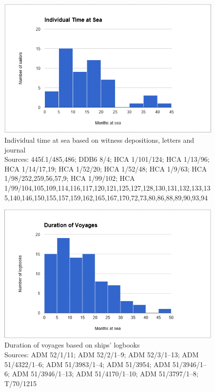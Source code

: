 \begin{figure}
  

\includegraphics[width=\textwidth]{figures/delgado-img9.png}
 

\caption{\label{fig:key:4.2} Individual time at sea based on witness depositions, letters and journal\\
{\tiny Sources: 445f.1/485,486; DDB6 8/4; HCA 1/101/124; HCA 1/13/96; HCA 1/14/17,19; HCA 1/52/20; HCA 1/52/48; HCA 1/9/63; HCA 1/98/252,259,56,57,9; HCA 1/99/102; HCA 1/99/104,105,109,114,116,117,120,121,125,127,128,130,131,132,133,135,140,146,150,155,157,159,162,165,167,170,72,73,80,86,88,89,90,93,94}
}
\end{figure}


\begin{figure}
  

\includegraphics[width=\textwidth]{figures/delgado-img10.png}
 

\caption{\label{fig:key:4.3} Duration of voyages based on ships’ logbooks\\
{\tiny Sources: ADM 52/1/11; ADM 52/2/1–9; ADM 52/3/1–13; ADM 51/4322/1–6; ADM 51/3983/1–4; ADM 51/3954; ADM 51/3946/1–6; ADM 51/3946/1–13; ADM 51/4170/1–10; ADM 51/3797/1–8; T/70/1215}
}
\end{figure}



